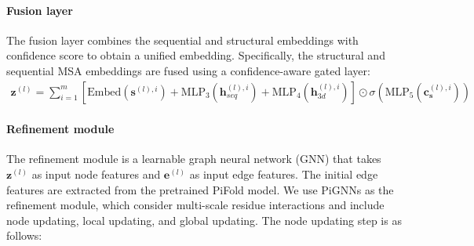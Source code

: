 \documentclass{article}
\begin{document}
\paragraph{Fusion layer} The fusion layer combines the sequential and structural embeddings with confidence score to obtain a unified embedding.  Specifically, the structural and sequential MSA embeddings are fused using a confidence-aware gated layer:
\begin{align}
    \boldsymbol{z}^{(l)}  = \sum_{i=1}^m \left[  \text{Embed}(\boldsymbol{s}^{(l),i}) +\text{MLP}_3(\boldsymbol{h}_{seq}^{(l),i})+\text{MLP}_4(\boldsymbol{h}_{3d}^{(l),i}) \right] \odot \sigma(\text{MLP}_5(\boldsymbol{c}_{\boldsymbol{s}}^{(l),i}))
    \label{eq:fusion}
\end{align}

\paragraph{Refinement module} The refinement module is a learnable graph neural network (GNN) that takes $\boldsymbol{z}^{(l)}$ as input node features and $\boldsymbol{e}^{(l)}$ as input edge features. The initial edge features are extracted from the pretrained PiFold model. We use PiGNNs as the refinement module, which consider multi-scale residue interactions and include node updating, local updating, and global updating. The node updating step is as follows:
\end{document}
